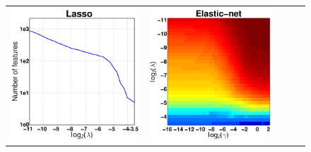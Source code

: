 \begin{figure}[ptbh]
\begin{tabular}{ccccc}
	\includegraphics[height=\imheight,width=\imwidth]{sim_gridsearch_lass_nnz100.pdf} &
	\includegraphics[height=\imheight,width=\imwidth]{sim_gridsearch_enet_nnz100.pdf} &

\end{tabular}
\end{figure}
